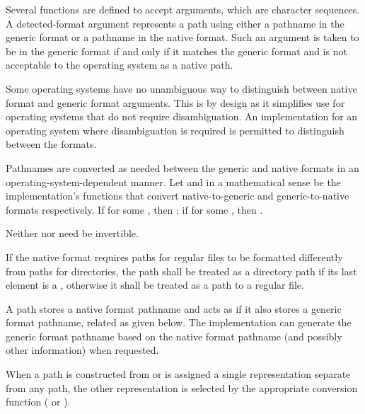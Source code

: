 \pnum
Several functions are defined to accept  arguments,
which are character sequences. A detected-format argument represents a path
using either a pathname in the generic format
or a pathname in the native format.
Such an argument is taken to be in the generic format if and only if
it matches the generic format and is not acceptable to the operating system
as a native path.

\pnum
\begin{note}
Some operating systems have no unambiguous way to distinguish between native format and generic format arguments.
This is by design as it simplifies use for operating systems that do not require
disambiguation. An implementation for an operating system where disambiguation
is required is permitted to distinguish between the formats.
\end{note}

\pnum
Pathnames are converted as needed between the generic and native formats
in an operating-system-dependent manner.
Let  and  in a mathematical sense
be the implementation's functions that convert native-to-generic
and generic-to-native formats respectively.
If  for some , then ;
if  for some , then .
\begin{note}
Neither  nor  need be invertible.
\end{note}

\pnum
If the native format requires paths for regular files to be formatted
differently from paths for directories, the path shall be treated as a directory
path if its last element is a ,
otherwise it shall be treated as a path to a regular file.

\pnum
\begin{note}
A path stores a native format pathname
and acts as if it also stores a generic format pathname,
related as given below.
The implementation can generate the generic format pathname
based on the native format pathname (and possibly other information)
when requested.
\end{note}

\pnum
When a path is constructed from or is assigned a single representation
separate from any path, the other representation is selected
by the appropriate conversion function ( or ).

